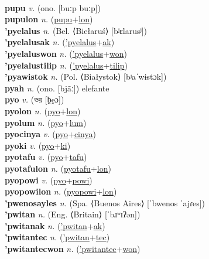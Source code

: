  \label{puthulon} \\
\textbf{pupu} \textit{v.} (ono. [buːp buːp])
 \label{pupu} \\
\textbf{pupulon} \textit{n.} (\hyperref[pupu]{pupu}+\hyperref[lon]{lon})
 \label{pupulon} \\
\textbf{'pyelalus} \textit{n.} (Bel. ⟨Biełaruś⟩ [bʲɛlarusʲ])
 \label{'pyelalus} \\
\textbf{'pyelalusak} \textit{n.} (\hyperref['pyelalus]{'pyelalus}+\hyperref[ak]{ak})
 \label{'pyelalusak} \\
\textbf{'pyelaluswon} \textit{n.} (\hyperref['pyelalus]{'pyelalus}+\hyperref[won]{won})
 \label{'pyelaluswon} \\
\textbf{'pyelalustilip} \textit{n.} (\hyperref['pyelalus]{'pyelalus}+\hyperref[tilip]{tilip})
 \label{'pyelalustilip} \\
\textbf{'pyawistok} \textit{n.} (Pol. ⟨Białystok⟩ [bʲaˈwɨstɔk])
 \label{'pyawistok} \\
\textbf{pyah} \textit{n.} (ono. [bjãː])
elefante \label{pyah} \\
\textbf{pyo} \textit{v.} ({\bengali{}ভয়} [b̤e̯ɔ])
 \label{pyo} \\
\textbf{pyolon} \textit{n.} (\hyperref[pyo]{pyo}+\hyperref[lon]{lon})
 \label{pyolon} \\
\textbf{pyolum} \textit{n.} (\hyperref[pyo]{pyo}+\hyperref[lum]{lum})
 \label{pyolum} \\
\textbf{pyocinya} \textit{v.} (\hyperref[pyo]{pyo}+\hyperref[cinya]{cinya})
 \label{pyocinya} \\
\textbf{pyoki} \textit{v.} (\hyperref[pyo]{pyo}+\hyperref[ki]{ki})
 \label{pyoki} \\
\textbf{pyotafu} \textit{v.} (\hyperref[pyo]{pyo}+\hyperref[tafu]{tafu})
 \label{pyotafu} \\
\textbf{pyotafulon} \textit{n.} (\hyperref[pyotafu]{pyotafu}+\hyperref[lon]{lon})
 \label{pyotafulon} \\
\textbf{pyopowi} \textit{v.} (\hyperref[pyo]{pyo}+\hyperref[powi]{powi})
 \label{pyopowi} \\
\textbf{pyopowilon} \textit{n.} (\hyperref[pyopowi]{pyopowi}+\hyperref[lon]{lon})
 \label{pyopowilon} \\
\textbf{'pwenosayles} \textit{n.} (Spa. ⟨Buenos Aires⟩ [ˈbwenos ˈajɾes])
 \label{'pwenosayles} \\
\textbf{'pwitan} \textit{n.} (Eng. ⟨Britain⟩ [ˈbɹʷɪʔən])
 \label{'pwitan} \\
\textbf{'pwitanak} \textit{n.} (\hyperref['pwitan]{'pwitan}+\hyperref[ak]{ak})
 \label{'pwitanak} \\
\textbf{'pwitantec} \textit{n.} (\hyperref['pwitan]{'pwitan}+\hyperref[tec]{tec})
 \label{'pwitantec} \\
\textbf{'pwitantecwon} \textit{n.} (\hyperref['pwitantec]{'pwitantec}+\hyperref[won]{won})
 \label{'pwitantecwon} \\
